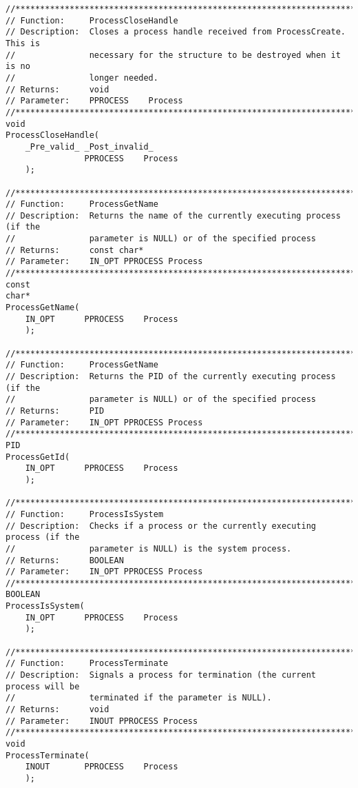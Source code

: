 \begin{appendices}
\begin{lstlisting}[caption={Process Public Interface},label={lst:ProcPublic}]
//******************************************************************************
// Function:     ProcessCloseHandle
// Description:  Closes a process handle received from ProcessCreate. This is
//               necessary for the structure to be destroyed when it is no
//               longer needed.
// Returns:      void
// Parameter:    PPROCESS    Process
//******************************************************************************
void
ProcessCloseHandle(
    _Pre_valid_ _Post_invalid_
                PPROCESS    Process
    );

//******************************************************************************
// Function:     ProcessGetName
// Description:  Returns the name of the currently executing process (if the
//               parameter is NULL) or of the specified process
// Returns:      const char*
// Parameter:    IN_OPT PPROCESS Process
//******************************************************************************
const
char*
ProcessGetName(
    IN_OPT      PPROCESS    Process
    );

//******************************************************************************
// Function:     ProcessGetName
// Description:  Returns the PID of the currently executing process (if the
//               parameter is NULL) or of the specified process
// Returns:      PID
// Parameter:    IN_OPT PPROCESS Process
//******************************************************************************
PID
ProcessGetId(
    IN_OPT      PPROCESS    Process
    );

//******************************************************************************
// Function:     ProcessIsSystem
// Description:  Checks if a process or the currently executing process (if the
//               parameter is NULL) is the system process.
// Returns:      BOOLEAN
// Parameter:    IN_OPT PPROCESS Process
//******************************************************************************
BOOLEAN
ProcessIsSystem(
    IN_OPT      PPROCESS    Process
    );

//******************************************************************************
// Function:     ProcessTerminate
// Description:  Signals a process for termination (the current process will be
//               terminated if the parameter is NULL).
// Returns:      void
// Parameter:    INOUT PPROCESS Process
//******************************************************************************
void
ProcessTerminate(
    INOUT       PPROCESS    Process
    );


\end{lstlisting}
\end{appendices}
